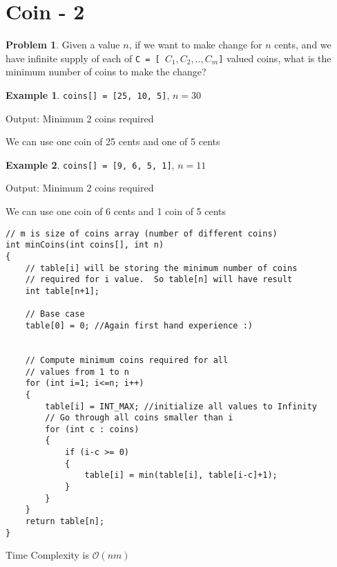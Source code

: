 \documentclass[twoside,12pt,a4paper,english]{book}
\theoremstyle{definition}
\newtheorem*{exmp}{Example}
\theoremstyle{problemstyle}
\newtheorem*{problem}{Problem} %
\theoremstyle{problemstyle}
\theoremstyle{problemstyle}
\begin{document}
\section{Coin - 2}
\begin{problem}
Given a value $n$, if we want to make change for $n$ cents, and we have infinite supply of each of \texttt{C = [ $C_1, C_2, .. , C_m$]} valued coins, what is the minimum number of coins to make the change?
\end{problem}
\begin{exmp}
\texttt{coins[] = [25, 10, 5]}, $n = 30$

Output: Minimum 2 coins required

We can use one coin of 25 cents and one of 5 cents
\end{exmp}
\begin{exmp}
\texttt{coins[] = [9, 6, 5, 1]}, $n = 11$

Output: Minimum 2 coins required

We can use one coin of 6 cents and 1 coin of 5 cents
\end{exmp}
\begin{tcolorbox}[title=Solution]

\begin{lstlisting}
// m is size of coins array (number of different coins)
int minCoins(int coins[], int n)
{
    // table[i] will be storing the minimum number of coins
    // required for i value.  So table[n] will have result
    int table[n+1];

    // Base case
    table[0] = 0; //Again first hand experience :)


    // Compute minimum coins required for all
    // values from 1 to n
    for (int i=1; i<=n; i++)
    {
        table[i] = INT_MAX; //initialize all values to Infinity
        // Go through all coins smaller than i
        for (int c : coins)
        {
            if (i-c >= 0)
            {
                table[i] = min(table[i], table[i-c]+1);
            }
        }
    }
    return table[n];
}
\end{lstlisting}
Time Complexity is $\mathcal{O}(nm)$
\end{tcolorbox}
\newpage
\end{document}
